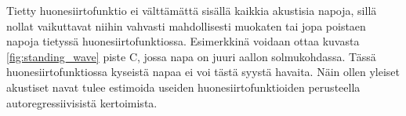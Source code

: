 \documentclass[finnish,12pt]{article}
\begin{document}
Tietty huonesiirtofunktio ei välttämättä sisällä kaikkia akustisia napoja, sillä nollat vaikuttavat niihin vahvasti mahdollisesti muokaten tai jopa poistaen napoja tietyssä huonesiirtofunktiossa. Esimerkkinä voidaan ottaa kuvasta \ref{fig:standing_wave} piste C, jossa napa on juuri aallon solmukohdassa. Tässä huonesiirtofunktiossa kyseistä napaa ei voi tästä syystä havaita. Näin ollen yleiset akustiset navat tulee estimoida useiden huonesiirtofunktioiden perusteella autoregressiivisistä kertoimista. \cite{YHaneda1994,YHaneda1997}

\end{document}
